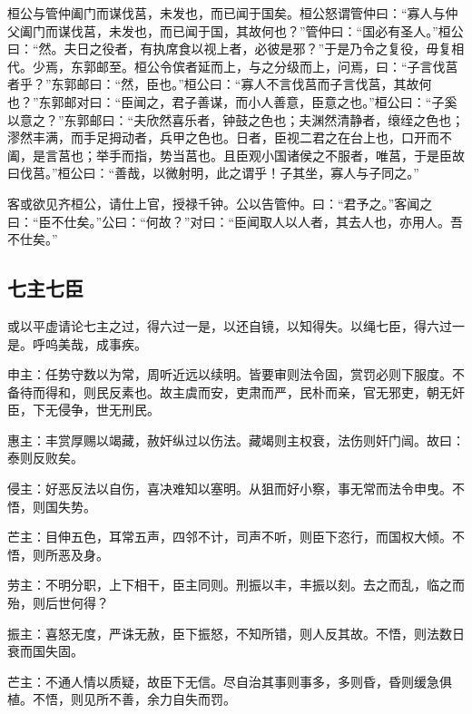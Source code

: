 \documentclass[]{article}
\begin{document}
桓公与管仲阖门而谋伐莒，未发也，而已闻于国矣。桓公怒谓管仲曰：``寡人与仲父阖门而谋伐莒，未发也，而已闻于国，其故何也？''管仲曰：``国必有圣人。''桓公曰：``然。夫日之役者，有执席食以视上者，必彼是邪？''于是乃令之复役，毋复相代。少焉，东郭邮至。桓公令傧者延而上，与之分级而上，问焉，曰：``子言伐莒者乎？''东郭邮曰：``然，臣也。''桓公曰：``寡人不言伐莒而子言伐莒，其故何也？''东郭邮对曰：``臣闻之，君子善谋，而小人善意，臣意之也。''桓公曰：``子奚以意之？''东郭邮曰：``夫欣然喜乐者，钟鼓之色也；夫渊然清静者，缞绖之色也；漻然丰满，而手足拇动者，兵甲之色也。日者，臣视二君之在台上也，口开而不阖，是言莒也；举手而指，势当莒也。且臣观小国诸侯之不服者，唯莒，于是臣故曰伐莒。''桓公曰：``善哉，以微射明，此之谓乎！子其坐，寡人与子同之。''

客或欲见齐桓公，请仕上官，授禄千钟。公以告管仲。曰：``君予之。''客闻之曰：``臣不仕矣。''公曰：``何故？''对曰：``臣闻取人以人者，其去人也，亦用人。吾不仕矣。''

\hypertarget{header-n669}{%
\subsection{七主七臣}\label{header-n669}}

或以平虚请论七主之过，得六过一是，以还自镜，以知得失。以绳七臣，得六过一是。呼呜美哉，成事疾。

申主：任势守数以为常，周听近远以续明。皆要审则法令固，赏罚必则下服度。不备待而得和，则民反素也。故主虞而安，吏肃而严，民朴而亲，官无邪吏，朝无奸臣，下无侵争，世无刑民。

惠主：丰赏厚赐以竭藏，赦奸纵过以伤法。藏竭则主权衰，法伤则奸门闿。故曰：泰则反败矣。

侵主：好恶反法以自伤，喜决难知以塞明。从狙而好小察，事无常而法令申曳。不悟，则国失势。

芒主：目伸五色，耳常五声，四邻不计，司声不听，则臣下恣行，而国权大倾。不悟，则所恶及身。

劳主：不明分职，上下相干，臣主同则。刑振以丰，丰振以刻。去之而乱，临之而殆，则后世何得？

振主：喜怒无度，严诛无赦，臣下振怒，不知所错，则人反其故。不悟，则法数日衰而国失固。

芒主：不通人情以质疑，故臣下无信。尽自治其事则事多，多则昏，昏则缓急俱植。不悟，则见所不善，余力自失而罚。
\end{document}
